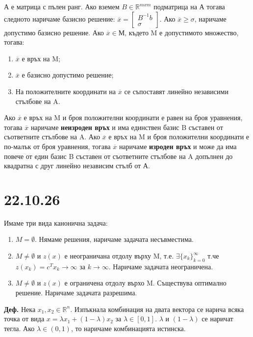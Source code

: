 \documentclass[12pt, a4paper]{article}
\def\D{\mathbb}
\begin{document}
А е матрица с пълен ранг. Ако вземем $B\in\D{R}^{mxm}$ подматрица на А тогава следното наричаме базисно решение: $\overline{x}=
\begin{bmatrix}
	B^{-1}b\\
	\sigma
\end{bmatrix}
$. Ако $\overline{x}\geq\sigma$, наричаме допустимо базисно решение. Ако $\overline{x}\in М$, където M е допустимото множество, тогава:\\
\begin{enumerate}
	\item $\overline{x}$ е връх на M;
	\item $\overline{x}$ е базисно допустимо решение;
	\item На положителните координати на $\overline{x}$ се съпоставят линейно независими стълбове на A.
\end{enumerate}

Ако $\overline{x}$ е връх на M и броя положителни координати е равен на броя уравнения, тогава $\overline{x}$ наричаме \textbf{неизроден връх} и има единствен базис B съставен от съответните стълбове на A. Ако $\overline{x}$ е връх на M и броя положителни координати е по-малък от броя уравнения, тогава $\overline{x}$ наричаме \textbf{изроден връх} и може да има повече от един базис B съставен от съответните стълбове на A допълнен до квадратна с друг линейно независим стълб от А.\\

{\centering\section*{22.10.26}}
Имаме три вида канонична задача:
\begin{enumerate}
	\item $M = \emptyset$. Нямаме решения, наричаме задачата несъвместима.
	\item $M \ne \emptyset$ и $z(x)$ е неограничана отдолу върху M, т.е. $\exists\{x_k\}_{k=0}^\infty$ т.че $z(x_k)=c^Tx_k\rightarrow\infty$ за $k\rightarrow\infty$. Наричаме задачата неограничена.
	\item $M \ne \emptyset$ и $z(x)$ е ограничена отдолу върхо M. Съществува оптимално решение. Наричаме задачата разрешима.
\end{enumerate}

\textbf{Деф.} Нека $x_1, x_2 \in \D{R}^n$. Изпъкнала комбинация на двата вектора се нарича всяка точка от вида $x=\lambda x_1 + (1-\lambda)x_2$ за $\lambda\in[0,1]$. $\lambda$ и $(1-\lambda)$ се наричат тегла. Ако $\lambda \in (0,1)$, то наричаме комбинацията истинска.\\
\end{document}
